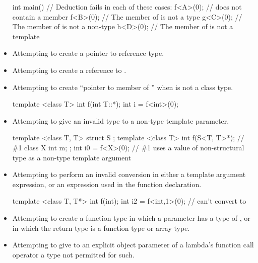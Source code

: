 \begin{note}
\begin{itemize}
\begin{example}
\begin{codeblock}
int main() {
  // Deduction fails in each of these cases:
  f<A>(0);          //  does not contain a member 
  f<B>(0);          // The  member of  is not a type
  g<C>(0);          // The  member of  is not a non-type
  h<D>(0);          // The  member of  is not a template
}
\end{codeblock}
\end{example}
\item
Attempting to create a pointer to reference type.
\item
Attempting to create a reference to .
\item
Attempting to create ``pointer to member of '' when  is not a
class type.
\begin{example}
\begin{codeblock}
template <class T> int f(int T::*);
int i = f<int>(0);
\end{codeblock}
\end{example}
\item
Attempting to give an invalid type to a non-type template parameter.
\begin{example}
\begin{codeblock}
template <class T, T> struct S {};
template <class T> int f(S<T, T{}>*);   // \#1
class X {
  int m;
};
int i0 = f<X>(0);   // \#1 uses a value of non-structural type  as a non-type template argument
\end{codeblock}
\end{example}

\item
Attempting to perform an invalid conversion in either a template
argument expression, or an expression used in the function
declaration.
\begin{example}
\begin{codeblock}
template <class T, T*> int f(int);
int i2 = f<int,1>(0);           // can't convert  to 
\end{codeblock}
\end{example}

\item
Attempting to create a function type in which a parameter has a type
of , or in which the return type is a function type
or array type.

\item
Attempting to give to
an explicit object parameter of a lambda's function call operator
a type not permitted for such.
\end{itemize}
\end{note}

